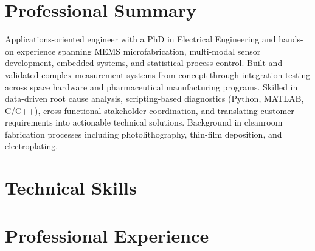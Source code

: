 \documentclass[letterpaper,11pt]{moderncv}
\begin{document}
\makecvtitle
\vspace{-3em}

\section{Professional Summary}
Applications-oriented engineer with a PhD in Electrical Engineering and hands-on experience spanning MEMS microfabrication, multi-modal sensor development, embedded systems, and statistical process control. Built and validated complex measurement systems from concept through integration testing across space hardware and pharmaceutical manufacturing programs. Skilled in data-driven root cause analysis, scripting-based diagnostics (Python, MATLAB, C/C++), cross-functional stakeholder coordination, and translating customer requirements into actionable technical solutions. Background in cleanroom fabrication processes including photolithography, thin-film deposition, and electroplating.

\section{Technical Skills}
\begin{minipage}[t]{0.48\textwidth}
\end{minipage}%
\hfill
\begin{minipage}[t]{0.48\textwidth}
\end{minipage}

\section{Professional Experience}
\end{document}
